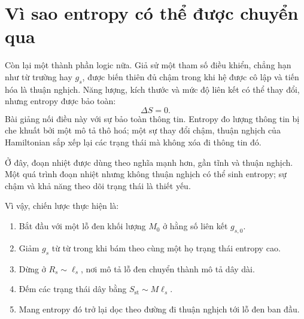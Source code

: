\section{Vì sao entropy có thể được chuyển qua}

Còn lại một thành phần logic nữa. Giả sử một tham số điều khiển, chẳng hạn như từ trường hay \(g_s\), được biến thiên đủ chậm trong khi hệ được cô lập và tiến hóa là thuận nghịch. Năng lượng, kích thước và mức độ liên kết có thể thay đổi, nhưng entropy được bảo toàn:
\begin{equation}
\Delta S=0.
\label{eq:l06-adiabatic-entropy}
\end{equation}
Bài giảng nối điều này với sự bảo toàn thông tin. Entropy đo lượng thông tin bị che khuất bởi một mô tả thô hoá; một sự thay đổi chậm, thuận nghịch của Hamiltonian sắp xếp lại các trạng thái mà không xóa đi thông tin đó.

\begin{classroomqa}
\end{classroomqa}

Ở đây, đoạn nhiệt được dùng theo nghĩa mạnh hơn, gần tĩnh và thuận nghịch. Một quá trình đoạn nhiệt nhưng không thuận nghịch có thể sinh entropy; sự chậm và khả năng theo dõi trạng thái là thiết yếu.

\begin{classroomqa}
\end{classroomqa}

Vì vậy, chiến lược thực hiện là:
\begin{enumerate}
\item Bắt đầu với một lỗ đen khối lượng \(M_0\) ở hằng số liên kết \(g_{s,0}\).
\item Giảm \(g_s\) từ từ trong khi bám theo cùng một họ trạng thái entropy cao.
\item Dừng ở \(R_s\sim\ell_s\), nơi mô tả lỗ đen chuyển thành mô tả dây dài.
\item Đếm các trạng thái dây bằng \(S_{\mathrm{st}}\sim M\ell_s\).
\item Mang entropy đó trở lại dọc theo đường đi thuận nghịch tới lỗ đen ban đầu.
\end{enumerate}

